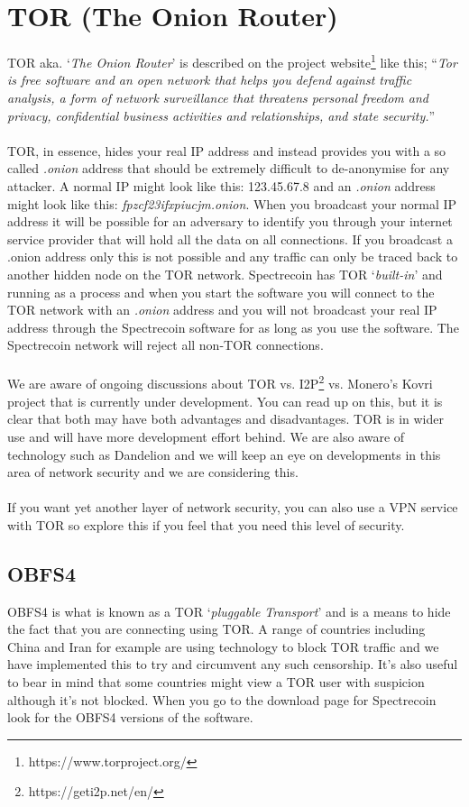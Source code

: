 \section{TOR (The Onion Router)}
TOR aka. ‘\textit{The Onion Router}’ is described on the project
website\footnote{https://www.torproject.org/ } like this; “\textit{Tor is
free software and an open network that helps you defend against traffic
analysis, a form of network surveillance that threatens personal freedom
and privacy, confidential business activities and relationships, and
state security.}”
\\
\\
\noindent
TOR, in essence, hides your real IP address and instead provides you with
a so called \textit{.onion} address that should be extremely difficult to
de-anonymise for any attacker. A normal IP might look like this: 123.45.67.8
and an \textit{.onion} address might look like this:
\textit{fpzcf23ifxpiucjm.onion}. When you broadcast your normal IP address
it will be possible for an adversary to identify you through your internet
service provider that will hold all the data on all connections. If you
broadcast a .onion address only this is not possible and any traffic can
only be traced back to another hidden node on the TOR network. Spectrecoin
has TOR ‘\textit{built-in}’ and running as a process and when you start the
software you will connect to the TOR network with an \textit{.onion} address
and you will not broadcast your real IP address through the Spectrecoin
software for as long as you use the software. The Spectrecoin network will
reject all non-TOR connections.
\\
\\
\noindent
We are aware of ongoing discussions about TOR vs. I2P\footnote{https://geti2p.net/en/}
vs. Monero’s Kovri project that is currently under development. You can
read up on this, but it is clear that both may have both advantages and
disadvantages. TOR is in wider use and will have more development effort
behind. We are also aware of technology such as Dandelion and we will keep
an eye on developments in this area of network security and we are
considering this.
\\
\\
\noindent
If you want yet another layer of network security, you can also use a VPN
service with TOR so explore this if you feel that you need this level of
security.


\subsection{OBFS4}
OBFS4 is what is known as a TOR ‘\textit{pluggable Transport}’ and is a
means to hide the fact that you are connecting using TOR. A range of
countries including China and Iran for example are using technology to
block TOR traffic and we have implemented this to try and circumvent any
such censorship. It’s also useful to bear in mind that some countries might
view a TOR user with suspicion although it’s not blocked. When you go to
the download page for Spectrecoin look for the OBFS4 versions of the
software.



